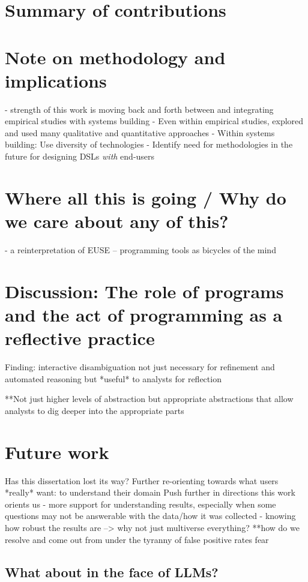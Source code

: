 \section{Summary of contributions}
\section{Note on methodology and implications}
- strength of this work is moving back and forth between and integrating empirical studies with systems building
- Even within empirical studies, explored and used many qualitative and quantitative approaches
- Within systems building: Use diversity of technologies
- Identify need for methodologies in the future for designing DSLs \textit{with} end-users
\section{Where all this is going / Why do we care about any of this?}
- a reinterpretation of EUSE -- programming tools as bicycles of the mind

\section{Discussion: The role of programs and the act of programming as a reflective practice}
Finding: interactive disambiguation not just necessary for refinement and automated reasoning but *useful* to analysts for reflection

**Not just higher levels of abstraction but appropriate abstractions that allow analysts to dig deeper into the appropriate parts


\section{Future work}
Has this dissertation lost its way? Further re-orienting towards what users *really* want: to understand their domain
Push further in directions this work orients us 
- more support for understanding results, especially when some questions may not be answerable with the data/how it was collected
- knowing how robust the results are --> why not just multiverse everything?
**how do we resolve and come out from under the tyranny of false positive rates fear

\subsection{}
\subsection{What about in the face of LLMs?}
